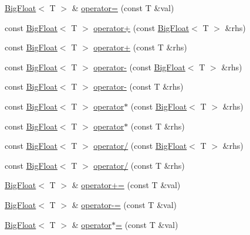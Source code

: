 \begin{DoxyCompactItemize}
\item 
\hyperlink{classatl_1_1_big_float}{Big\+Float}$<$ T $>$ \& \hyperlink{classatl_1_1_big_float_a876b50ae052f8d2a18c9e4ae87d202e1}{operator=} (const T \&val)
\item 
const \hyperlink{classatl_1_1_big_float}{Big\+Float}$<$ T $>$ \hyperlink{classatl_1_1_big_float_a569d28d2dd7fd7062d2fc0ce19fdc4a5}{operator+} (const \hyperlink{classatl_1_1_big_float}{Big\+Float}$<$ T $>$ \&rhs)
\item 
const \hyperlink{classatl_1_1_big_float}{Big\+Float}$<$ T $>$ \hyperlink{classatl_1_1_big_float_adaafb406bbccfcfe7c49c20c2943fa01}{operator+} (const T \&rhs)
\item 
const \hyperlink{classatl_1_1_big_float}{Big\+Float}$<$ T $>$ \hyperlink{classatl_1_1_big_float_a326e659936b3feea06db3f97f340c247}{operator-\/} (const \hyperlink{classatl_1_1_big_float}{Big\+Float}$<$ T $>$ \&rhs)
\item 
const \hyperlink{classatl_1_1_big_float}{Big\+Float}$<$ T $>$ \hyperlink{classatl_1_1_big_float_ad0626d190e91676cfdec2d87ba7c1cb4}{operator-\/} (const T \&rhs)
\item 
const \hyperlink{classatl_1_1_big_float}{Big\+Float}$<$ T $>$ \hyperlink{classatl_1_1_big_float_abaa4e8948190feeaa1352c6f08ddbec4}{operator$\ast$} (const \hyperlink{classatl_1_1_big_float}{Big\+Float}$<$ T $>$ \&rhs)
\item 
const \hyperlink{classatl_1_1_big_float}{Big\+Float}$<$ T $>$ \hyperlink{classatl_1_1_big_float_a1de1dcb86fd40aa2effd901da47bf2bb}{operator$\ast$} (const T \&rhs)
\item 
const \hyperlink{classatl_1_1_big_float}{Big\+Float}$<$ T $>$ \hyperlink{classatl_1_1_big_float_aaa4be4696cf2d2588a85796cc8834834}{operator/} (const \hyperlink{classatl_1_1_big_float}{Big\+Float}$<$ T $>$ \&rhs)
\item 
const \hyperlink{classatl_1_1_big_float}{Big\+Float}$<$ T $>$ \hyperlink{classatl_1_1_big_float_ad4440506f3e80335bbd073c0d6b61174}{operator/} (const T \&rhs)
\item 
\hyperlink{classatl_1_1_big_float}{Big\+Float}$<$ T $>$ \& \hyperlink{classatl_1_1_big_float_a5a2c7e78ee4ac1d5df620d722b98bc05}{operator+=} (const T \&val)
\item 
\hyperlink{classatl_1_1_big_float}{Big\+Float}$<$ T $>$ \& \hyperlink{classatl_1_1_big_float_aa8efdf4d28c9bdaaec40b8470efefee2}{operator-\/=} (const T \&val)
\item 
\hyperlink{classatl_1_1_big_float}{Big\+Float}$<$ T $>$ \& \hyperlink{classatl_1_1_big_float_aee07b9ca3edecd8c536087bf7359dbbd}{operator$\ast$=} (const T \&val)

\end{DoxyCompactItemize}
